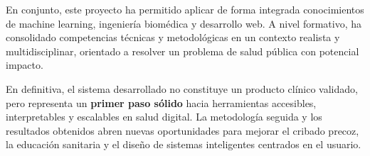 En conjunto, este proyecto ha permitido aplicar de forma integrada conocimientos de machine learning, ingeniería biomédica y desarrollo web. A nivel formativo, ha consolidado competencias técnicas y metodológicas en un contexto realista y multidisciplinar, orientado a resolver un problema de salud pública con potencial impacto.

En definitiva, el sistema desarrollado no constituye un producto clínico validado, pero representa un \textbf{primer paso sólido} hacia herramientas accesibles, interpretables y escalables en salud digital. La metodología seguida y los resultados obtenidos abren nuevas oportunidades para mejorar el cribado precoz, la educación sanitaria y el diseño de sistemas inteligentes centrados en el usuario.
